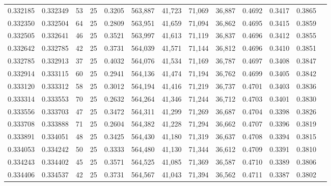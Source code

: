 \begin{tabular}{rrrrrrrrrrrrr}
0.332185 & 0.332349 &    53 &  25 &                                     0.3205 & 563,887 &  41,723 &  71,069 &  36,887 & 0.4692 & 0.3417 & 0.3865 \\
0.332350 & 0.332504 &    64 &  25 &                                     0.2809 & 563,951 &  41,659 &  71,094 &  36,862 & 0.4695 & 0.3415 & 0.3859 \\
0.332505 & 0.332641 &    46 &  25 &                                     0.3521 & 563,997 &  41,613 &  71,119 &  36,837 & 0.4696 & 0.3412 & 0.3855 \\
0.332642 & 0.332785 &    42 &  25 &                                     0.3731 & 564,039 &  41,571 &  71,144 &  36,812 & 0.4696 & 0.3410 & 0.3851 \\
0.332785 & 0.332913 &    37 &  25 &                                     0.4032 & 564,076 &  41,534 &  71,169 &  36,787 & 0.4697 & 0.3408 & 0.3847 \\
0.332914 & 0.333115 &    60 &  25 &                                     0.2941 & 564,136 &  41,474 &  71,194 &  36,762 & 0.4699 & 0.3405 & 0.3842 \\
0.333120 & 0.333312 &    58 &  25 &                                     0.3012 & 564,194 &  41,416 &  71,219 &  36,737 & 0.4701 & 0.3403 & 0.3836 \\
0.333314 & 0.333553 &    70 &  25 &                                     0.2632 & 564,264 &  41,346 &  71,244 &  36,712 & 0.4703 & 0.3401 & 0.3830 \\
0.333556 & 0.333703 &    47 &  25 &                                     0.3472 & 564,311 &  41,299 &  71,269 &  36,687 & 0.4704 & 0.3398 & 0.3826 \\
0.333708 & 0.333888 &    71 &  25 &                                     0.2604 & 564,382 &  41,228 &  71,294 &  36,662 & 0.4707 & 0.3396 & 0.3819 \\
0.333891 & 0.334051 &    48 &  25 &                                     0.3425 & 564,430 &  41,180 &  71,319 &  36,637 & 0.4708 & 0.3394 & 0.3815 \\
0.334053 & 0.334242 &    50 &  25 &                                     0.3333 & 564,480 &  41,130 &  71,344 &  36,612 & 0.4709 & 0.3391 & 0.3810 \\
0.334243 & 0.334402 &    45 &  25 &                                     0.3571 & 564,525 &  41,085 &  71,369 &  36,587 & 0.4710 & 0.3389 & 0.3806 \\
0.334406 & 0.334537 &    42 &  25 &                                     0.3731 & 564,567 &  41,043 &  71,394 &  36,562 & 0.4711 & 0.3387 & 0.3802 \\

\end{tabular}
